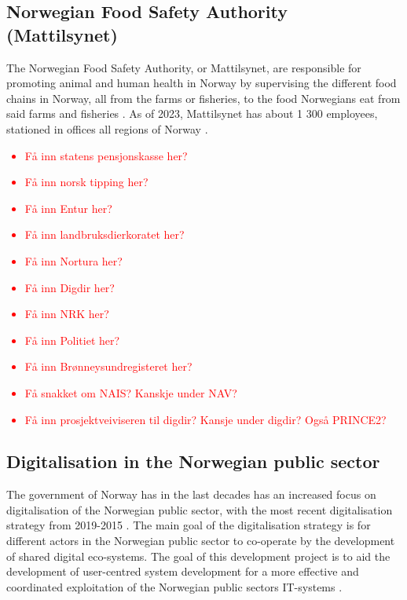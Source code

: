 \subsection{Norwegian Food Safety Authority (Mattilsynet)}
The Norwegian Food Safety Authority, or Mattilsynet, are responsible for promoting animal and human health in Norway by supervising the different food chains in Norway, all from the farms or fisheries, to the food Norwegians eat from said farms and fisheries \cite{mat_r_2023}. As of 2023, Mattilsynet has about 1 300 employees, stationed in offices all regions of Norway \cite{org_mat_2023}.

\textcolor{red}{
\begin{itemize}
    \item Få inn statens pensjonskasse her?
    \item Få inn norsk tipping her?
    \item Få inn Entur her?
    \item Få inn landbruksdierkoratet her?
    \item Få inn Nortura her?
    \item Få inn Digdir her?
    \item Få inn NRK her?
    \item Få inn Politiet her?
    \item Få inn Brønneysundregisteret her?
\end{itemize}
}

\textcolor{red}{
\begin{itemize}
    \item Få snakket om NAIS? Kanskje under NAV?
    \item Få inn prosjektveiviseren til digdir? Kansje under digdir? Også PRINCE2?
\end{itemize}
}

\subsection{Digitalisation in the Norwegian public sector}
The government of Norway has in the last decades has an increased focus on digitalisation of the Norwegian public sector, with the most recent digitalisation strategy from 2019-2015 \cite{r_2019}. The main goal of the digitalisation strategy is for different actors in the Norwegian public sector to co-operate by the development of shared digital eco-systems. The goal of this development project is to aid the development of user-centred system development for a more effective and coordinated exploitation of the Norwegian public sectors IT-systems \cite{r_2019}.


